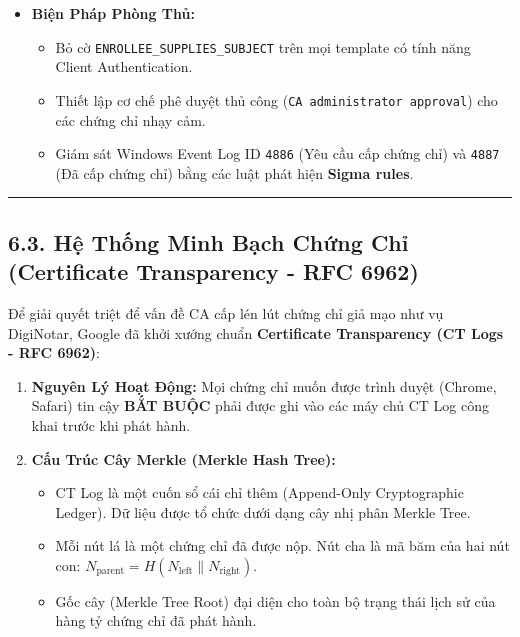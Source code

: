 \documentclass[
]{article}
\providecommand{\tightlist}{%
  \setlength{\itemsep}{0pt}\setlength{\parskip}{0pt}}
\begin{document}
\begin{itemize}
\tightlist
\item
  \textbf{Biện Pháp Phòng Thủ:}

  \begin{itemize}
  \tightlist
  \item
    Bỏ cờ \texttt{ENROLLEE\_SUPPLIES\_SUBJECT} trên mọi template có tính
    năng Client Authentication.
  \item
    Thiết lập cơ chế phê duyệt thủ công
    (\texttt{CA\ administrator\ approval}) cho các chứng chỉ nhạy cảm.
  \item
    Giám sát Windows Event Log ID \texttt{4886} (Yêu cầu cấp chứng chỉ)
    và \texttt{4887} (Đã cấp chứng chỉ) bằng các luật phát hiện
    \textbf{Sigma rules}.
  \end{itemize}
\end{itemize}

\begin{center}\rule{0.5\linewidth}{0.5pt}\end{center}

\subsection{6.3. Hệ Thống Minh Bạch Chứng Chỉ (Certificate Transparency
- RFC
6962)}\label{hux1ec7-thux1ed1ng-minh-bux1ea1ch-chux1ee9ng-chux1ec9-certificate-transparency---rfc-6962}

Để giải quyết triệt để vấn đề CA cấp lén lút chứng chỉ giả mạo như vụ
DigiNotar, Google đã khởi xướng chuẩn \textbf{Certificate Transparency
(CT Logs - RFC 6962)}:

\begin{enumerate}
\def\labelenumi{\arabic{enumi}.}
\tightlist
\item
  \textbf{Nguyên Lý Hoạt Động:} Mọi chứng chỉ muốn được trình duyệt
  (Chrome, Safari) tin cậy \textbf{BẮT BUỘC} phải được ghi vào các máy
  chủ CT Log công khai trước khi phát hành.
\item
  \textbf{Cấu Trúc Cây Merkle (Merkle Hash Tree):}

  \begin{itemize}
  \tightlist
  \item
    CT Log là một cuốn sổ cái chỉ thêm (Append-Only Cryptographic
    Ledger). Dữ liệu được tổ chức dưới dạng cây nhị phân Merkle Tree.
  \item
    Mỗi nút lá là một chứng chỉ đã được nộp. Nút cha là mã băm của hai
    nút con:
    \(N_{\text{parent}} = H(N_{\text{left}} \parallel N_{\text{right}})\).
  \item
    Gốc cây (Merkle Tree Root) đại diện cho toàn bộ trạng thái lịch sử
    của hàng tỷ chứng chỉ đã phát hành.
  \end{itemize}
\end{enumerate}
\end{document}
